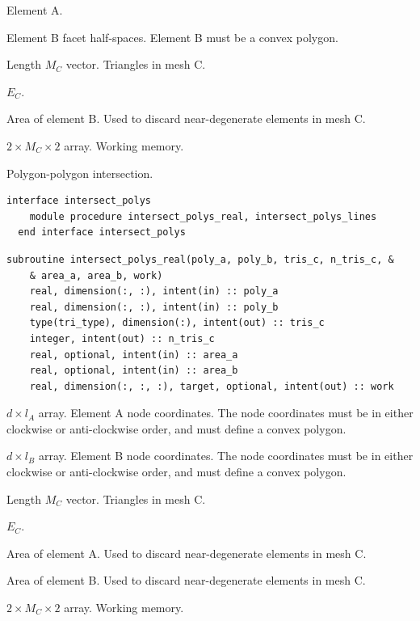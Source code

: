 \documentclass{article}
\begin{document}
\begin{description}[font=\ttfamily\bfseries,leftmargin=2.2\parindent,labelindent=1.7\parindent,noitemsep]
  \item[tri\_a] Element A.
  \item[lines\_b] Element B facet half-spaces. Element B must be a convex
    polygon.
  \item[tris\_c] Length $M_C$ vector. Triangles in mesh C.
  \item[n\_tris\_c] $E_C$.
  \item[area\_b] Area of element B. Used to discard near-degenerate elements in
    mesh C.
  \item[work] $2 \times M_C \times 2$ array. Working memory.
\end{description}

\noindent Polygon-polygon intersection.
  
\begin{lstlisting}[language=FORTRAN]
  interface intersect_polys
    module procedure intersect_polys_real, intersect_polys_lines
  end interface intersect_polys
\end{lstlisting}
  
\begin{lstlisting}[language=FORTRAN]
  subroutine intersect_polys_real(poly_a, poly_b, tris_c, n_tris_c, &
    & area_a, area_b, work)
    real, dimension(:, :), intent(in) :: poly_a
    real, dimension(:, :), intent(in) :: poly_b
    type(tri_type), dimension(:), intent(out) :: tris_c
    integer, intent(out) :: n_tris_c
    real, optional, intent(in) :: area_a
    real, optional, intent(in) :: area_b
    real, dimension(:, :, :), target, optional, intent(out) :: work
\end{lstlisting}

\begin{description}[font=\ttfamily\bfseries,leftmargin=2.2\parindent,labelindent=1.7\parindent,noitemsep]
  \item[poly\_a] $d \times l_A$ array. Element A node coordinates. The node
    coordinates must be in either clockwise or anti-clockwise order, and must
    define a convex polygon.
  \item[poly\_b] $d \times l_B$ array. Element B node coordinates. The node
    coordinates must be in either clockwise or anti-clockwise order, and must
    define a convex polygon.
  \item[tris\_c] Length $M_C$ vector. Triangles in mesh C.
  \item[n\_tris\_c] $E_C$.
  \item[area\_a] Area of element A. Used to discard near-degenerate elements in
    mesh C.
  \item[area\_b] Area of element B. Used to discard near-degenerate elements in
    mesh C.
  \item[work] $2 \times M_C \times 2$ array. Working memory.
\end{description}
\end{document}
